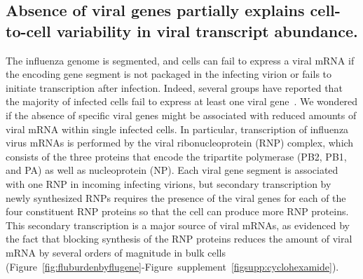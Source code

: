 \documentclass[9pt,lineno]{elife}
\begin{document}
\subsection{Absence of viral genes partially explains cell-to-cell variability in viral transcript abundance.}
The influenza genome is segmented, and cells can fail to express a viral mRNA if the encoding gene segment is not packaged in the infecting virion or fails to initiate transcription after infection.
Indeed, several groups have reported that the majority of infected cells fail to express at least one viral gene~\citep{brooke2013most}. 
We wondered if the absence of specific viral genes might be associated with reduced amounts of viral mRNA within single infected cells.
In particular, transcription of influenza virus mRNAs is performed by the viral ribonucleoprotein (RNP) complex, which consists of the three proteins that encode the tripartite polymerase (PB2, PB1, and PA) as well as nucleoprotein (NP).
Each viral gene segment is associated with one RNP in incoming infecting virions, but secondary transcription by newly synthesized RNPs requires the presence of the viral genes for each of the four constituent RNP proteins so that the cell can produce more RNP proteins.
This secondary transcription is a major source of viral mRNAs, as evidenced by the fact that blocking synthesis of the RNP proteins reduces the amount of viral mRNA by several orders of magnitude in bulk cells (Figure~\ref{fig:fluburdenbyflugene}-Figure~supplement~\ref{figsupp:cyclohexamide}).
\end{document}

